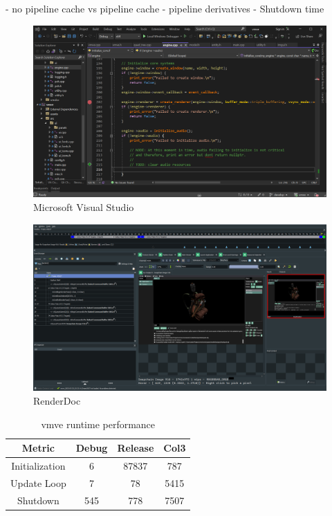 \documentclass[11pt]{article}
\begin{document}
	- no pipeline cache vs pipeline cache
	- pipeline derivatives
- Shutdown time

\begin{figure}[H]
  \centering
  \includegraphics[width=\textwidth]{images/visual_studio.png}
  \caption{Microsoft Visual Studio}
  \label{fig:visual_studio}
\end{figure}

\begin{figure}[H]
  \centering
  \includegraphics[width=\textwidth]{images/renderdoc.png}
  \caption{RenderDoc}
  \label{fig:renderdoc}
\end{figure}




\begin{table}[H]
\centering
\begin{tabular}{||c c c c||} 
  \hline
  Metric & Debug & Release & Col3 \\ [0.5ex] 
  \hline\hline
  Initialization & 6 & 87837 & 787 \\ 
  Update Loop & 7 & 78 & 5415 \\
  Shutdown & 545 & 778 & 7507 \\ [1ex] 
  \hline
\end{tabular}
\caption{\gls*{vmve} runtime performance}
\label{fig:runtime_performance}
\end{table}
\end{document}
